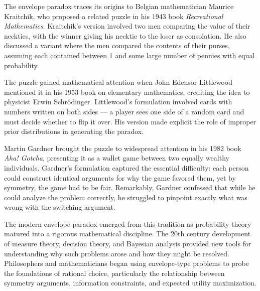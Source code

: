 \begin{historical}
The envelope paradox traces its origins to Belgian mathematician Maurice Kraitchik, who proposed a related puzzle in his 1943 book \textit{Recreational Mathematics}. Kraitchik's version involved two men comparing the value of their neckties, with the winner giving his necktie to the loser as consolation. He also discussed a variant where the men compared the contents of their purses, assuming each contained between 1 and some large number of pennies with equal probability.

The puzzle gained mathematical attention when John Edensor Littlewood mentioned it in his 1953 book on elementary mathematics, crediting the idea to physicist Erwin Schrödinger. Littlewood's formulation involved cards with numbers written on both sides — a player sees one side of a random card and must decide whether to flip it over. His version made explicit the role of improper prior distributions in generating the paradox.

Martin Gardner brought the puzzle to widespread attention in his 1982 book \textit{Aha! Gotcha}, presenting it as a wallet game between two equally wealthy individuals. Gardner's formulation captured the essential difficulty: each person could construct identical arguments for why the game favored them, yet by symmetry, the game had to be fair. Remarkably, Gardner confessed that while he could analyze the problem correctly, he struggled to pinpoint exactly what was wrong with the switching argument.

The modern envelope paradox emerged from this tradition as probability theory matured into a rigorous mathematical discipline. The 20th century development of measure theory, decision theory, and Bayesian analysis provided new tools for understanding why such problems arose and how they might be resolved. Philosophers and mathematicians began using envelope-type problems to probe the foundations of rational choice, particularly the relationship between symmetry arguments, information constraints, and expected utility maximization.
\end{historical}

